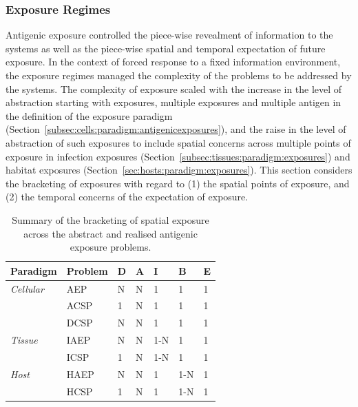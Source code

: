 \subsubsection{Exposure Regimes}
Antigenic exposure controlled the piece-wise revealment of information to the systems as well as the piece-wise spatial and temporal expectation of future exposure. In the context of forced response to a fixed information environment, the exposure regimes managed the complexity of the problems to be addressed by the systems. The complexity of exposure scaled with the increase in the level of abstraction starting with exposures, multiple exposures and multiple antigen in the definition of the exposure paradigm (Section~\ref{subsec:cells:paradigm:antigenicexposures}), and the raise in the level of abstraction of such exposures to include spatial concerns across multiple points of exposure in infection exposures (Section~\ref{subsec:tissues:paradigm:exposures}) and habitat exposures (Section~\ref{sec:hosts:paradigm:exposures}).
This section considers the bracketing of exposures with regard to (1) the spatial points of exposure, and (2) the temporal concerns of the expectation of exposure.

\begin{table}[htp]
	\centering\small
		\begin{tabular}{lllllll}
		\toprule
		\textbf{Paradigm} & \textbf{Problem} & \textbf{D} & \textbf{A} & \textbf{I} & \textbf{B} & \textbf{E} \\ 
		\toprule
		\emph{Cellular} & AEP & N & N & 1 & 1 & 1 \\ 
		 & ACSP 							& 1 & N & 1 & 1 & 1 \\ 
		 & DCSP 							& N & N & 1 & 1 & 1 \\ 
		\midrule
		\emph{Tissue} & IAEP 	& N & N & 1-N & 1 & 1 \\ 
		 & ICSP 							& 1 & N & 1-N & 1 & 1 \\ 
		\midrule
		\emph{Host} & HAEP 		& N & N & 1 & 1-N & 1 \\ 
		 & HCSP 							& 1 & N & 1 & 1-N & 1 \\ 
		\bottomrule
		\end{tabular}
	\caption{Summary of the bracketing of spatial exposure across the abstract and realised antigenic exposure problems.}
	\label{tab:framework:haef:bracketing:exposures:spatial}
\end{table}

